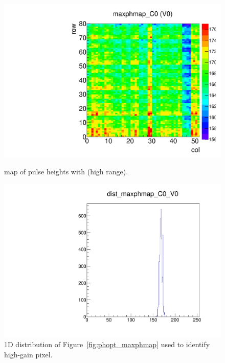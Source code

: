 \begin{figure}[!htp]
\centering
\begin{minipage}{0.45\textwidth}
  \includegraphics[width=1.0\textwidth]{figures/phopt_maxphmap.pdf}
  \caption{\roc map of pulse heights with  (high range).}
  \label{fig:phopt_maxphmap}
\end{minipage}
\hspace{0.3cm}
\begin{minipage}{0.45\textwidth}
  \includegraphics[width=1.0\textwidth]{figures/phopt_dist_maxphmap.pdf}
  \caption{1D distribution of Figure~\ref{fig:phopt_maxphmap}
           used to identify high-gain pixel.}
  \label{fig:phopt_dist_maxphmap}
\end{minipage}
\end{figure}

